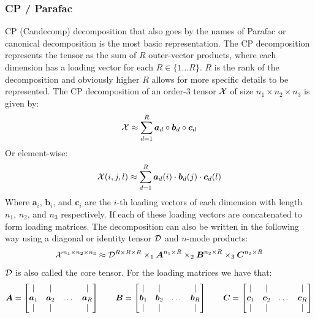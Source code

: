\subsubsection{CP / Parafac}
CP (Candecomp) decomposition that also goes by the names of Parafac or canonical decomposition is the most basic representation. The CP decomposition represents the tensor as the sum of $R$ outer-vector products, where each dimension has a loading vector for each $R\in \{1\dots R\}$. $R$ is the rank of the decomposition and obviously higher $R$ allows for more specific details to be represented. The CP decomposition of an order-3 tensor $\mathcal{X}$ of size $n_1\times n_2 \times n_3$ is given by:
\begin{equation}
    \mathcal{X} \approx \sum_{d=1}^R \boldsymbol{a}_d \circ \boldsymbol{b}_d \circ \boldsymbol{c}_d
\end{equation}
Or element-wise:
\begin{equation}
    \mathcal{X}(i, j, l) \approx \sum_{d=1}^R \boldsymbol{a}_d(i) \cdot \boldsymbol{b}_d(j) \cdot \boldsymbol{c}_d(l)
\end{equation}
Where $\boldsymbol{a}_i$, $\boldsymbol{b}_i$, and $\boldsymbol{c}_i$ are the $i$-th loading vectors of each dimension with length $n_1$, $n_2$, and $n_3$ respectively. If each of these loading vectors are concatenated to form loading matrices. The decomposition can also be written in the following way using a diagonal or identity tensor $\mathcal{D}$ and $n$-mode products:
\begin{equation}
    \mathcal{X}^{n_1 \times n_2 \times n_3} \approx \mathcal{D}^{R\times R\times R} \times_1 \boldsymbol{A}^{n_1 \times R} \times_2 \boldsymbol{B}^{n_2 \times R} \times_3 \boldsymbol{C}^{n_3 \times R}
    \label{eq:CP_matrix_rep}
\end{equation}
$\mathcal{D}$ is also called the core tensor. For the loading matrices we have that:
\begin{equation}
    \boldsymbol{A} = \begin{bmatrix} | & | & & |\\ \boldsymbol{a}_1 & \boldsymbol{a}_2 & \dots & \boldsymbol{a}_R \\ | & | & & | \end{bmatrix} \qquad \boldsymbol{B} = \begin{bmatrix} | & | & & |\\ \boldsymbol{b}_1 & \boldsymbol{b}_2 & \dots & \boldsymbol{b}_R \\ | & | & & | \end{bmatrix} \qquad \boldsymbol{C} = \begin{bmatrix} | & | & & |\\ \boldsymbol{c}_1 & \boldsymbol{c}_2 & \dots & \boldsymbol{c}_R \\ | & | & & | \end{bmatrix}
\end{equation}
